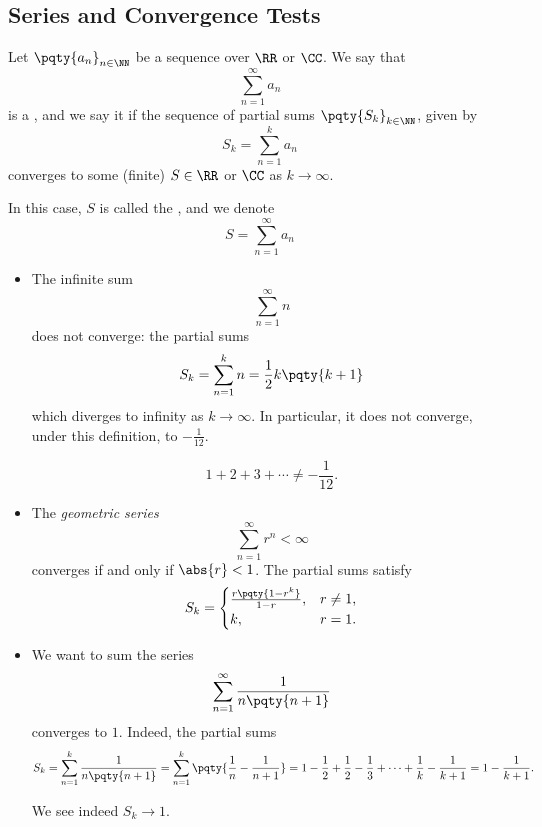 \subsection{Series and Convergence Tests}

\begin{definition}[Series]
    Let \(\pqty{a_n}_{n \in \NN}\) be a sequence over \(\RR\) or \(\CC\). We say that
    \[
        \sum_{n = 1}^{\infty} a_n
    \]
    is a , and we say it  if the sequence of partial sums \(\pqty{S_k}_{k \in \NN}\), given by
    \[
        S_k = \sum_{n = 1}^{k} a_n
    \]
    converges to some (finite) \(S \in \RR\) or \(\CC\) as \(k \to \infty\).

    In this case, \(S\) is called the , and we denote
    \[
        S = \sum_{n = 1}^{\infty} a_n
    \]
\end{definition}

\begin{examples}
    \label{ex:seq-infinite-series}
    \begin{itemize}
        \item The infinite sum
        \[
            \sum_{n = 1}^{\infty} n
        \]
        does not converge: the partial sums
        \[
            S_k = \sum_{n = 1}^{k} n = \frac{1}{2} k \pqty{k + 1}
        \]
        which diverges to infinity as \(k \to \infty\). In particular, it does not converge, under this definition,  to \(- \frac{1}{12}\).

        \[
            1 + 2 + 3 + \cdots \neq - \frac{1}{12}.
        \]

        \item The \emph{geometric series}
        \[
            \sum_{n = 1}^{\infty} r^n < \infty
        \]
        converges if and only if \(\abs{r} < 1\). The partial sums satisfy
        \[
            S_k = \begin{cases}
                \frac{r\pqty{1 - r^k}}{1 - r}, & r \neq 1, \\
                k, & r = 1.
            \end{cases}
        \]


        \item We want to sum the series
        \[
            \sum_{n = 1}^{\infty} \frac{1}{n \pqty{n + 1}}
        \]
        converges to \(1\). Indeed, the partial sums
        \[
            S_k = \sum_{n = 1}^{k} \frac{1}{n \pqty{n + 1}} = \sum_{n = 1}^{k} \pqty{\frac{1}{n} - \frac{1}{n + 1}} = 1 - \frac{1}{2} + \frac{1}{2} - \frac{1}{3} + \cdots + \frac{1}{k} - \frac{1}{k + 1} = 1 - \frac{1}{k + 1}.
        \]

        We see indeed \(S_k \to 1\).
    \end{itemize}
\end{examples}

